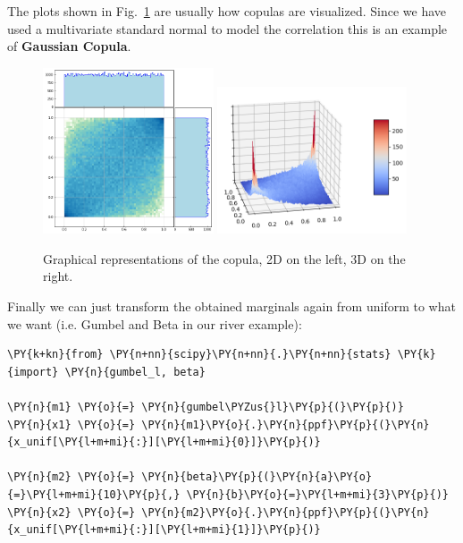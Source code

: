 The plots shown in Fig.~\ref{fig:copula} are usually how copulas are visualized. Since we have used a multivariate standard normal 
to model the correlation this is an example of \textbf{Gaussian Copula}.

\begin{figure}[htb]
\centering
\includegraphics[width=0.45\textwidth]{figures/lesson6_16_0.png}
\quad
\includegraphics[width=0.5\textwidth]{figures/copula_3d.png}
\caption{Graphical representations of the copula, 2D on the left, 3D on the right.}
\label{fig:copula}
\end{figure}

Finally we can just transform the obtained marginals again from uniform to what we want
(i.e. Gumbel and Beta in our river example):

\begin{tcolorbox}[breakable, size=fbox, boxrule=1pt, pad at break*=1mm,colback=cellbackground, colframe=cellborder]
\begin{Verbatim}[commandchars=\\\{\}]
\PY{k+kn}{from} \PY{n+nn}{scipy}\PY{n+nn}{.}\PY{n+nn}{stats} \PY{k}{import} \PY{n}{gumbel_l, beta}

\PY{n}{m1} \PY{o}{=} \PY{n}{gumbel\PYZus{}l}\PY{p}{(}\PY{p}{)}
\PY{n}{x1} \PY{o}{=} \PY{n}{m1}\PY{o}{.}\PY{n}{ppf}\PY{p}{(}\PY{n}{x_unif[\PY{l+m+mi}{:}][\PY{l+m+mi}{0}]}\PY{p}{)}

\PY{n}{m2} \PY{o}{=} \PY{n}{beta}\PY{p}{(}\PY{n}{a}\PY{o}{=}\PY{l+m+mi}{10}\PY{p}{,} \PY{n}{b}\PY{o}{=}\PY{l+m+mi}{3}\PY{p}{)}
\PY{n}{x2} \PY{o}{=} \PY{n}{m2}\PY{o}{.}\PY{n}{ppf}\PY{p}{(}\PY{n}{x_unif[\PY{l+m+mi}{:}][\PY{l+m+mi}{1}]}\PY{p}{)}
\end{Verbatim}
\end{tcolorbox}

